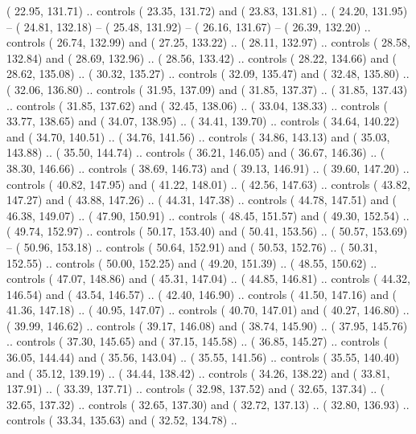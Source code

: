 {        (  22.95, 131.71) .. controls (  23.35, 131.72) and (  23.83, 131.81) ..
        (  24.20, 131.95) -- 
        (  24.81, 132.18) -- 
        (  25.48, 131.92) -- 
        (  26.16, 131.67) -- 
        (  26.39, 132.20) .. controls (  26.74, 132.99) and (  27.25, 133.22) ..
        (  28.11, 132.97) .. controls (  28.58, 132.84) and (  28.69, 132.96) ..
        (  28.56, 133.42) .. controls (  28.22, 134.66) and (  28.62, 135.08) ..
        (  30.32, 135.27) .. controls (  32.09, 135.47) and (  32.48, 135.80) ..
        (  32.06, 136.80) .. controls (  31.95, 137.09) and (  31.85, 137.37) ..
        (  31.85, 137.43) .. controls (  31.85, 137.62) and (  32.45, 138.06) ..
        (  33.04, 138.33) .. controls (  33.77, 138.65) and (  34.07, 138.95) ..
        (  34.41, 139.70) .. controls (  34.64, 140.22) and (  34.70, 140.51) ..
        (  34.76, 141.56) .. controls (  34.86, 143.13) and (  35.03, 143.88) ..
        (  35.50, 144.74) .. controls (  36.21, 146.05) and (  36.67, 146.36) ..
        (  38.30, 146.66) .. controls (  38.69, 146.73) and (  39.13, 146.91) ..
        (  39.60, 147.20) .. controls (  40.82, 147.95) and (  41.22, 148.01) ..
        (  42.56, 147.63) .. controls (  43.82, 147.27) and (  43.88, 147.26) ..
        (  44.31, 147.38) .. controls (  44.78, 147.51) and (  46.38, 149.07) ..
        (  47.90, 150.91) .. controls (  48.45, 151.57) and (  49.30, 152.54) ..
        (  49.74, 152.97) .. controls (  50.17, 153.40) and (  50.41, 153.56) ..
        (  50.57, 153.69) -- 
        (  50.96, 153.18) .. controls (  50.64, 152.91) and (  50.53, 152.76) ..
        (  50.31, 152.55) .. controls (  50.00, 152.25) and (  49.20, 151.39) ..
        (  48.55, 150.62) .. controls (  47.07, 148.86) and (  45.31, 147.04) ..
        (  44.85, 146.81) .. controls (  44.32, 146.54) and (  43.54, 146.57) ..
        (  42.40, 146.90) .. controls (  41.50, 147.16) and (  41.36, 147.18) ..
        (  40.95, 147.07) .. controls (  40.70, 147.01) and (  40.27, 146.80) ..
        (  39.99, 146.62) .. controls (  39.17, 146.08) and (  38.74, 145.90) ..
        (  37.95, 145.76) .. controls (  37.30, 145.65) and (  37.15, 145.58) ..
        (  36.85, 145.27) .. controls (  36.05, 144.44) and (  35.56, 143.04) ..
        (  35.55, 141.56) .. controls (  35.55, 140.40) and (  35.12, 139.19) ..
        (  34.44, 138.42) .. controls (  34.26, 138.22) and (  33.81, 137.91) ..
        (  33.39, 137.71) .. controls (  32.98, 137.52) and (  32.65, 137.34) ..
        (  32.65, 137.32) .. controls (  32.65, 137.30) and (  32.72, 137.13) ..
        (  32.80, 136.93) .. controls (  33.34, 135.63) and (  32.52, 134.78) ..
}
